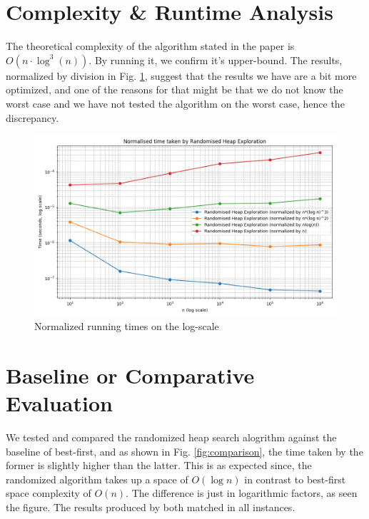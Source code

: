 \documentclass{article}
\begin{document}
\section{Complexity \& Runtime Analysis}
The theoretical complexity of the algorithm stated in the paper is $O(n\cdot \log^3(n))$. By running it, we confirm it's upper-bound. The results, normalized by division in Fig. \ref{fig:normailsed-run-time}, suggest that the results we have are a bit more optimized, and one of the reasons for that might be that we do not know the worst case and we have not tested the algorithm on the worst case, hence the discrepancy.
\begin{figure}
    \centering
    \includegraphics[width=1\linewidth]{images/normalised_performance_comparison.png}
    \caption{Normalized running times on the log-scale}
    \label{fig:normailsed-run-time}
\end{figure}
\section{Baseline or Comparative Evaluation}
We tested and compared the randomized heap search alogrithm against the baseline of best-first, and as shown in Fig. \ref{fig:comparison}, the time taken by the former is slightly higher than the latter. This is as expected since, the randomized algorithm takes up a space of $O(\log n)$ in contrast to best-first space complexity of $O(n)$. The difference is just in logarithmic factors, as seen the figure. The results produced by both matched in all instances.
\end{document}
